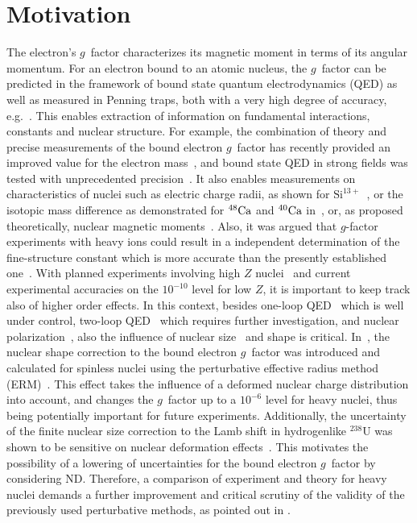 \section{Motivation}
\label{sec:gfac_motiv}
The electron's $g$~factor characterizes its magnetic moment in terms of its angular momentum. For an electron bound to an atomic nucleus, the $g$~factor can be predicted in the framework of bound state quantum electrodynamics (QED) as well as measured in Penning traps, both with a very high degree of accuracy, e.g.~\cite{Sturm2014,Sturm2011}. This enables extraction of information on fundamental interactions, constants and nuclear structure. For example, the combination of theory and precise measurements of the bound electron $g$~factor has recently provided an improved value for the electron mass~\cite{Sturm2014}, and bound state QED in strong fields was tested with unprecedented precision~\cite{Haffner2000, Verdu2004, Kohler2015, Zatorski2017}. It also enables measurements on characteristics of nuclei such as electric charge radii, as shown for $\textrm{Si}^{13+}$~\cite{Sturm2011}, or the isotopic mass difference as demonstrated for $\null^{48} \textrm{Ca}$ and $\null^{40} \textrm{Ca}$ in~\cite{Kohler2016}, or, as proposed theoretically, nuclear magnetic moments~\cite{Yerokhin2011}.  Also, it was argued that $g$-factor experiments with heavy ions could result in a independent determination of the fine-structure constant which is more accurate than the presently established one~\cite{Shabaev2006,yerokhin2016}.
With planned experiments involving high $Z$ nuclei~\cite{HITRAP2008,vogel2015,sturm2017} and current experimental accuracies on the $10^{-10}$ level for low $Z$, it is important to keep track also of higher order effects. 
In this context, besides one-loop QED~\cite{Yerokhin2004,yerokhin2017} which is well under control, two-loop QED~\cite{Pachucki2005,yerokhin2013,czarnecki2016,czarnecki2018} which requires further investigation, and nuclear polarization~\cite{Nefiodov,volotka2014}, also the influence of nuclear size~\cite{karshenboim2000,Glazov2002} and shape is critical.
In~\cite{jacek2012, ZatorskiWorkingNotes}, the nuclear shape correction to the bound electron $g$~factor was introduced and calculated for spinless nuclei using the perturbative effective radius method (ERM)~\cite{Shabaev1993,kozhedub2008}. This effect takes the influence of a deformed nuclear charge distribution into account, and changes the $g$~factor up to a $10^{-6}$ level for heavy nuclei, thus being potentially important for future experiments.
Additionally, the uncertainty of the finite nuclear size correction to the Lamb shift in hydrogenlike $^{238}$U was shown to be sensitive on nuclear deformation effects~\cite{kozhedub2008}.
This motivates the possibility of a lowering of uncertainties for the bound electron $g$~factor by considering ND.
Therefore, a comparison of experiment and theory for heavy nuclei demands a further improvement and critical scrutiny of the validity of the previously used perturbative methods, as pointed out in \cite{karshenboim2018}.

